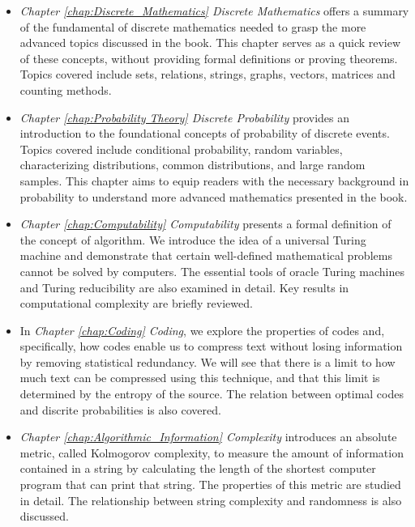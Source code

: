 \begin{itemize}

\item \emph{Chapter \ref{chap:Discrete_Mathematics} Discrete Mathematics} offers a summary of the fundamental of discrete mathematics needed to grasp the more advanced topics discussed in the book. This chapter serves as a quick review of these concepts, without providing formal definitions or proving theorems. Topics covered include sets, relations, strings, graphs, vectors, matrices and counting methods.

\item \emph{Chapter \ref{chap:Probability Theory} Discrete Probability} provides an introduction to the foundational concepts of probability of discrete events. Topics covered include conditional probability, random variables, characterizing distributions, common distributions, and large random samples. This chapter aims to equip readers with the necessary background in probability to understand more advanced mathematics presented in the book.

\item \emph{Chapter \ref{chap:Computability} Computability} presents a formal definition of the concept of algorithm. We introduce the idea of a universal Turing machine and demonstrate that certain well-defined mathematical problems cannot be solved by computers. The essential tools of oracle Turing machines and Turing reducibility are also examined in detail. Key results in computational complexity are briefly reviewed.

\item In \emph{Chapter \ref{chap:Coding} Coding}, we explore the properties of codes and, specifically, how codes enable us to compress text without losing information by removing statistical redundancy. We will see that there is a limit to how much text can be compressed using this technique, and that this limit is determined by the entropy of the source. The relation between optimal codes and discrite probabilities is also covered.

\item \emph{Chapter \ref{chap:Algorithmic_Information} Complexity} introduces an absolute metric, called Kolmogorov complexity, to measure the amount of information contained in a string by calculating the length of the shortest computer program that can print that string. The properties of this metric are studied in detail. The relationship between string complexity and randomness is also discussed.


\end{itemize}
